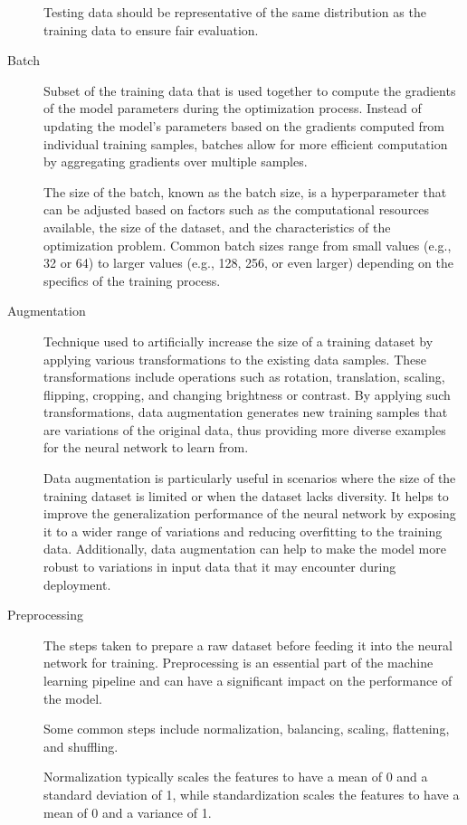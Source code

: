 \documentclass[a4paper]{report}
\begin{document}
\begin{description}
Testing data should be representative of the same distribution as the training data to ensure fair evaluation. 

\item[Batch]
Subset of the training data that is used together to compute the gradients of the model parameters during the optimization process. Instead of updating the model's parameters based on the gradients computed from individual training samples, batches allow for more efficient computation by aggregating gradients over multiple samples.

The size of the batch, known as the batch size, is a hyperparameter that can be adjusted based on factors such as the computational resources available, the size of the dataset, and the characteristics of the optimization problem. Common batch sizes range from small values (e.g., 32 or 64) to larger values (e.g., 128, 256, or even larger) depending on the specifics of the training process.

\item[Augmentation]
Technique used to artificially increase the size of a training dataset by applying various transformations to the existing data samples. These transformations include operations such as rotation, translation, scaling, flipping, cropping, and changing brightness or contrast. By applying such transformations, data augmentation generates new training samples that are variations of the original data, thus providing more diverse examples for the neural network to learn from.

Data augmentation is particularly useful in scenarios where the size of the training dataset is limited or when the dataset lacks diversity. It helps to improve the generalization performance of the neural network by exposing it to a wider range of variations and reducing overfitting to the training data. Additionally, data augmentation can help to make the model more robust to variations in input data that it may encounter during deployment.

\item[Preprocessing]
The steps taken to prepare a raw dataset before feeding it into the neural network for training. Preprocessing is an essential part of the machine learning pipeline and can have a significant impact on the performance of the model. 

Some common steps include normalization, balancing, scaling, flattening, and shuffling.

Normalization typically scales the features to have a mean of 0 and a standard deviation of 1, while standardization scales the features to have a mean of 0 and a variance of 1.


\end{description}
\end{document}
